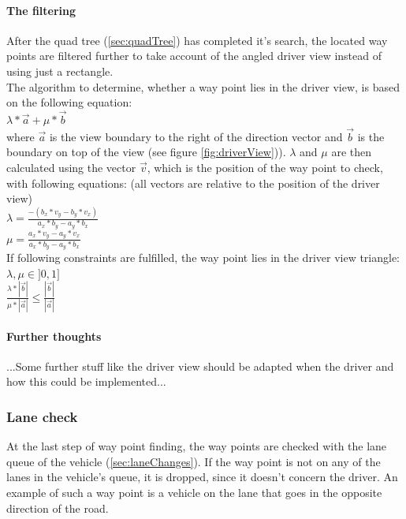 \paragraph{The filtering}

After the quad tree (\ref{sec:quadTree}) has completed it's search, the located way
points are filtered further to take account of the angled driver view instead
of using just a rectangle. \\

\noindent The algorithm to determine, whether a way point lies in the driver 
view, is based on the following equation: \\

$
\lambda * \vec{a} + \mu * \vec{b}
$ \\

\noindent where $\vec{a}$ is the view boundary to the right of the direction 
vector and $\vec{b}$ is the boundary on top of the view (see figure 
\ref{fig:driverView})). $\lambda$ and $\mu$ are then calculated using the 
vector $\vec{v}$, which is the position of the way point to check, with following
equations: (all vectors are relative to the position of the driver view) \\

$ \lambda = \frac{-(b_x*v_y - b_y * v_x)}{a_x * b_y - a_y * b_x}$\\

$\mu = \frac{a_x * v_y - a_y * v_x}{a_x * b_y - a_y * b_x} $ \\

\noindent If following constraints are fulfilled, the way point lies in the driver
view triangle: \\

$ \lambda, \mu \in ]0, 1]$ \\

$ \frac{\lambda * \left| \vec{b} \right| }{\mu * \left| \vec{a} \right|} \leq 
\frac{\left| \vec{b} \right|}{\left| \vec{a} \right|}$

\paragraph{Further thoughts}
...Some further stuff like the driver view should be adapted when the driver
and how this could be implemented...


\subsubsection{Lane check}

At the last step of way point finding, the way points are checked with the
lane queue of the vehicle (\ref{sec:laneChanges}). If the way point is not
on any of the lanes in the vehicle's queue, it is dropped, since it doesn't
concern the driver. An example of such a way point is a vehicle on the lane
that goes in the opposite direction of the road.

